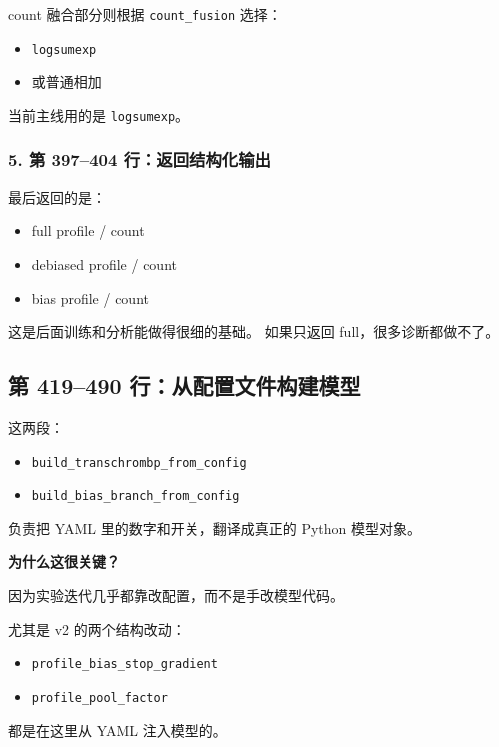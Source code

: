 \documentclass[11pt,a4paper]{ctexart}
\begin{document}
count 融合部分则根据 \texttt{count\_fusion} 选择：

\begin{itemize}[leftmargin=2em]
\item \texttt{logsumexp}
\item 或普通相加
\end{itemize}

当前主线用的是 \texttt{logsumexp}。

\subsubsection*{5. 第 397--404 行：返回结构化输出}

最后返回的是：

\begin{itemize}[leftmargin=2em]
\item full profile / count
\item debiased profile / count
\item bias profile / count
\end{itemize}

这是后面训练和分析能做得很细的基础。
如果只返回 full，很多诊断都做不了。

\subsection{第 419--490 行：从配置文件构建模型}

这两段：

\begin{itemize}[leftmargin=2em]
\item \texttt{build\_transchrombp\_from\_config}
\item \texttt{build\_bias\_branch\_from\_config}
\end{itemize}

负责把 YAML 里的数字和开关，翻译成真正的 Python 模型对象。

\textbf{为什么这很关键？}

因为实验迭代几乎都靠改配置，而不是手改模型代码。

尤其是 v2 的两个结构改动：

\begin{itemize}[leftmargin=2em]
\item \texttt{profile\_bias\_stop\_gradient}
\item \texttt{profile\_pool\_factor}
\end{itemize}

都是在这里从 YAML 注入模型的。
\end{document}
